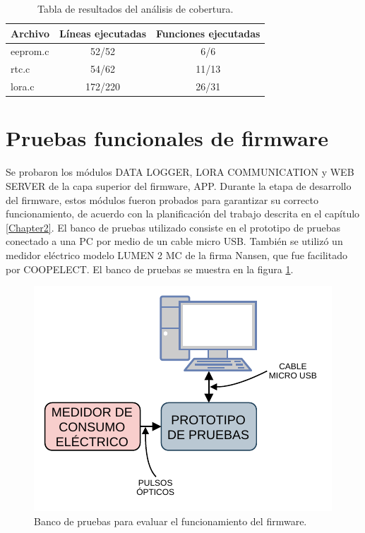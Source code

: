 \begin{table}[h]
	\centering
	\caption[Análisis de cobertura]{Tabla de resultados del análisis de cobertura.}
	\begin{tabular}{l c c}    
		\toprule
		\textbf{Archivo} & \textbf{Líneas ejecutadas} & \textbf{Funciones ejecutadas}  \\
		\midrule
		eeprom.c & 52/52 & 6/6 \\		
		rtc.c & 54/62 & 11/13 \\
		lora.c & 172/220 & 26/31 \\
		\bottomrule
		\hline
	\end{tabular}
	\label{tab:coverAnalysis}
\end{table}


\section{Pruebas funcionales de firmware}
\label{sec:pruebasFW}

Se probaron los módulos DATA LOGGER, LORA COMMUNICATION y WEB SERVER de la capa superior del firmware, APP. Durante la etapa de desarrollo del firmware, estos módulos fueron probados para garantizar su correcto funcionamiento, de acuerdo con la planificación del trabajo descrita en el capítulo \ref{Chapter2}. El banco de pruebas utilizado consiste en el prototipo de pruebas conectado a una PC por medio de un cable micro USB. También se utilizó un medidor eléctrico modelo LUMEN 2 MC de la firma Nansen, que fue facilitado por COOPELECT. El banco de pruebas se muestra en la figura \ref{fig:testFunctional}.

\begin{figure}[ht]
	\centering
	\includegraphics[scale=1.2]{./Figures/test_firmware_functional.pdf}
	\caption{Banco de pruebas para evaluar el funcionamiento del firmware.}
	\label{fig:testFunctional}
\end{figure}

